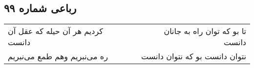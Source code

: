 \begin{center}
\section*{رباعی شماره ۹۹}
\label{sec:sh099}
\begin{longtable}{l p{0.5cm} r}
کردیم هر آن حیله که عقل آن دانست
&&
تا بو که توان راه به جانان دانست
\\
ره می‌نبریم وهم طمع می‌نبریم
&&
نتوان دانست بو که نتوان دانست
\\
\end{longtable}
\end{center}
